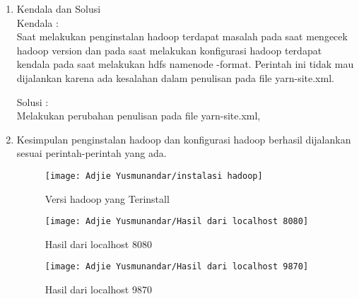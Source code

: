 

\begin{enumerate}
\item Kendala dan Solusi \\
Kendala :\\
Saat melakukan penginstalan hadoop terdapat masalah pada saat mengecek hadoop version dan  pada saat melakukan konfigurasi hadoop terdapat kendala pada saat melakukan hdfs namenode -format. Perintah ini tidak mau dijalankan karena ada kesalahan dalam penulisan pada file yarn-site.xml.

Solusi :\\
Melakukan perubahan penulisan pada file yarn-site.xml,

\item Kesimpulan
\newline
 penginstalan hadoop dan konfigurasi hadoop berhasil dijalankan sesuai perintah-perintah yang ada.

\begin{figure}
\setlength{\belowcaptionskip}{-10pt}
\texttt{[image: Adjie Yusmunandar/instalasi hadoop]}
\caption{Versi hadoop yang Terinstall}
\label{gam:hasil instalasi apache hadoop}
\end{figure}

\begin{figure}
\setlength{\belowcaptionskip}{-10pt}
\texttt{[image: Adjie Yusmunandar/Hasil dari localhost 8080]}
\caption{Hasil dari localhost 8080}
\label{gam:hasil konfigurasi hadoop}
\end{figure}

\begin{figure}
\setlength{\belowcaptionskip}{-10pt}
\texttt{[image: Adjie Yusmunandar/Hasil dari localhost 9870]}
\caption{Hasil dari localhost 9870}
\label{gam:hasil konfigurasi hadoop}
\end{figure}
\end{enumerate}

